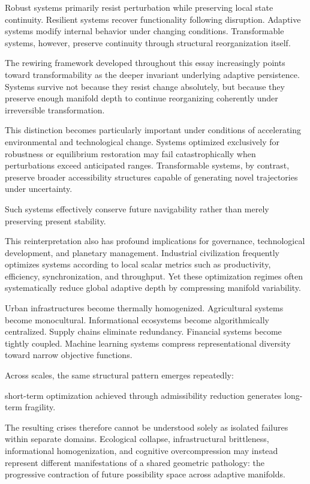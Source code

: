 \documentclass[11pt,a4paper]{article}
\begin{document}
Robust systems primarily resist perturbation while preserving local state continuity. Resilient systems recover functionality following disruption. Adaptive systems modify internal behavior under changing conditions. Transformable systems, however, preserve continuity through structural reorganization itself.

The rewiring framework developed throughout this essay increasingly points toward transformability as the deeper invariant underlying adaptive persistence. Systems survive not because they resist change absolutely, but because they preserve enough manifold depth to continue reorganizing coherently under irreversible transformation.

This distinction becomes particularly important under conditions of accelerating environmental and technological change. Systems optimized exclusively for robustness or equilibrium restoration may fail catastrophically when perturbations exceed anticipated ranges. Transformable systems, by contrast, preserve broader accessibility structures capable of generating novel trajectories under uncertainty.

Such systems effectively conserve future navigability rather than merely preserving present stability.

This reinterpretation also has profound implications for governance, technological development, and planetary management. Industrial civilization frequently optimizes systems according to local scalar metrics such as productivity, efficiency, synchronization, and throughput. Yet these optimization regimes often systematically reduce global adaptive depth by compressing manifold variability.

Urban infrastructures become thermally homogenized. Agricultural systems become monocultural. Informational ecosystems become algorithmically centralized. Supply chains eliminate redundancy. Financial systems become tightly coupled. Machine learning systems compress representational diversity toward narrow objective functions.

Across scales, the same structural pattern emerges repeatedly:

short-term optimization achieved through admissibility reduction generates long-term fragility.

The resulting crises therefore cannot be understood solely as isolated failures within separate domains. Ecological collapse, infrastructural brittleness, informational homogenization, and cognitive overcompression may instead represent different manifestations of a shared geometric pathology: the progressive contraction of future possibility space across adaptive manifolds.
\end{document}
